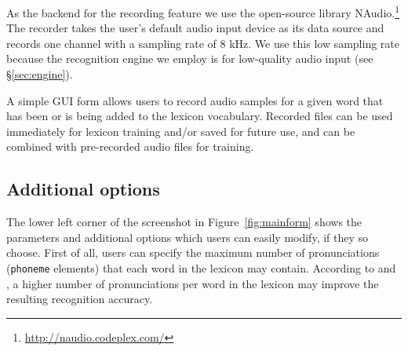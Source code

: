 \documentclass[11pt]{article}
\begin{document}
As the backend for the recording feature we use the open-source library NAudio.\footnote{\url{http://naudio.codeplex.com/}}
The recorder takes the user's default audio input device as its data source and records one channel with a sampling rate of 8 kHz. 
We use this low sampling rate because the recognition engine we employ is for low-quality audio input (see \S\ref{sec:engine}).

A simple GUI form allows users to record audio samples for a given word that has been or is being added to the lexicon vocabulary. Recorded files can be used immediately for lexicon training and/or saved for future use, and can be combined with pre-recorded audio files for training. 




\subsection{Additional options}
\label{sec:options}

The lower left corner of the screenshot in Figure~\ref{fig:mainform} shows the parameters and additional options which users can easily modify, if they so choose. First of all, users
can specify the maximum number of pronunciations (\texttt{phoneme} elements) that each word in the lexicon may contain. According to  and , a higher number of pronunciations per word in the lexicon may improve the resulting recognition accuracy.
\end{document}
